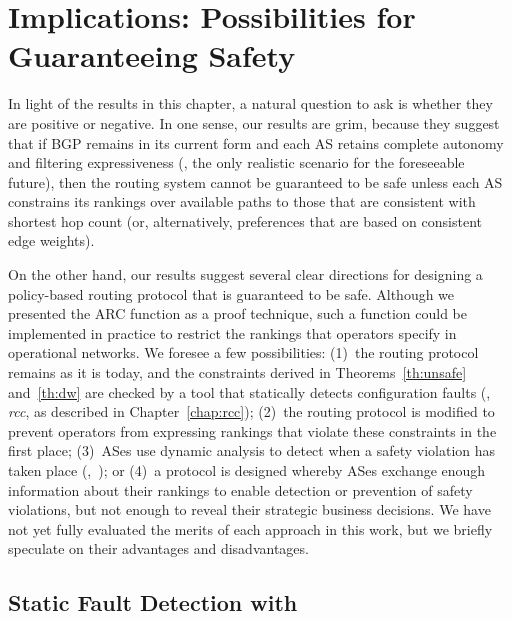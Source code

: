 \section{Implications: Possibilities for Guaranteeing
  Safety}\label{sec:policy:implications} 

In light of the results in this chapter, a natural question to ask is
whether they are 
positive or negative.  In one sense, our results are grim, because they
suggest that if BGP remains in its current form and each AS retains
complete autonomy and filtering expressiveness (\ie, the only realistic
scenario for the foreseeable future), then the routing system cannot be
guaranteed to be safe unless each AS constrains its rankings over
available paths to those that are consistent with shortest hop count
(or, alternatively, preferences that are based on consistent edge
weights).  

On the other hand, our results suggest several clear directions for
designing a policy-based routing protocol that is guaranteed to be safe.
Although we presented the ARC function as a proof technique, such a
function could be implemented in practice to restrict the rankings that
operators specify in operational networks.  We foresee a few
possibilities: (1)~the routing protocol remains as it is today, and the
constraints derived in Theorems~\ref{th:unsafe} and~\ref{th:dw} are
checked by a tool that statically detects configuration faults (\eg,
{\em rcc}, as described in Chapter~\ref{chap:rcc}); (2)~the routing protocol
is modified to 
prevent operators from expressing rankings that violate these
constraints in the first place; (3)~ASes use dynamic analysis to detect
when a safety violation has taken place (\eg,~\cite{Griffin2000}); or
(4)~a protocol is designed whereby ASes exchange enough information
about their rankings to enable detection or prevention of safety
violations, but not enough to reveal their strategic business decisions.
We have 
not yet fully evaluated the merits of each approach in this work, but we
briefly speculate on their advantages and disadvantages.


\subsection{Static Fault Detection with \rcc}

